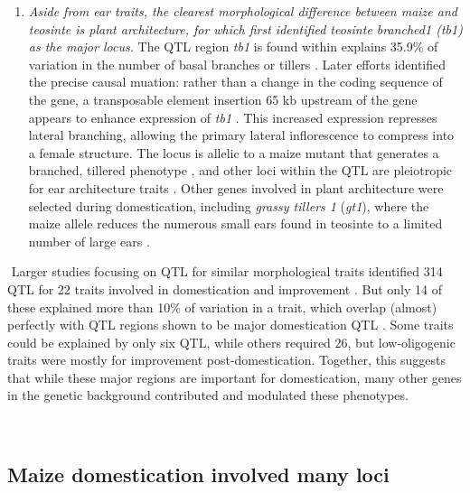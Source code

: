 \documentclass[a4paper]{article}
\begin{document}
\begin{enumerate}
﻿ \item \textit{Aside from ear traits, the clearest morphological difference between maize and teosinte is plant architecture, for which
 \citet{doebley1995} first identified \textit{teosinte branched1} (\textit{tb1}) as the major locus. }
 The QTL region \textit{tb1} is found within explains 35.9\% of variation in the number of basal branches or tillers \citep{doebley1991}.
 Later efforts identified the precise causal muation: rather than a change in the coding sequence of the gene, a transposable element insertion 65 kb upstream of the gene appears to enhance expression of \textit{tb1} \citep{studer2011}.
 This increased expression represses lateral branching, allowing the primary lateral inflorescence to compress into a female structure.
 The locus is allelic to a maize mutant that generates a branched, tillered phenotype \citep{burnham1959}, and other loci within the QTL are pleiotropic for ear architecture traits \citep{studer2011fract}.
 Other genes involved in plant architecture were selected during domestication, including \textit{grassy tillers 1} (\textit{gt1}), where the maize allele reduces the numerous small ears found in teosinte to a limited number of large ears \citep{wills2017}.


 \end{enumerate}

﻿
﻿Larger studies focusing on QTL for similar morphological traits identified 314 QTL for 22 traits involved in domestication and improvement \citep{briggs2007}.
But only 14 of these explained more than 10\% of variation in a trait, which overlap (almost) perfectly with QTL regions shown to be major domestication QTL \citep{doebley1993}.
Some traits could be explained by only six QTL, while others required 26, but low-oligogenic traits were mostly for improvement post-domestication.
﻿Together, this suggests that while these major regions are important for domestication, many other genes in the genetic background contributed and modulated these phenotypes.

﻿\subsection*{Maize domestication involved many loci}
\end{document}
